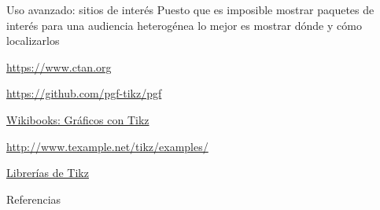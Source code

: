 \documentclass[10pt]{beamer}
\begin{document}
\begin{frame}[fragile]{Uso avanzado: sitios de interés}
Puesto que es imposible mostrar paquetes de interés para una 
audiencia heterogénea lo mejor es mostrar dónde y cómo localizarlos

\href{https://www.ctan.org}{\color{blue}https://www.ctan.org}

\href{https://github.com/pgf-tikz/pgf}{\color{blue}https://github.com/pgf-tikz/pgf}

\href{https://es.wikibooks.org/wiki/Manual_de_LaTeX/Inclusión_de_gráficos/Gráficos_con_TikZ}{\color{blue}Wikibooks: Gráficos con Tikz}

\href{http://www.texample.net/tikz/examples/}{\color{blue}http://www.texample.net/tikz/examples/}

\href{https://tex.stackexchange.com/questions/42611/list-of-available-tikz-libraries-with-a-short-introduction}{\color{blue} Librerías de Tikz}

\end{frame}


\begin{frame}[allowframebreaks]{Referencias}

%
\end{frame}
\end{document}
